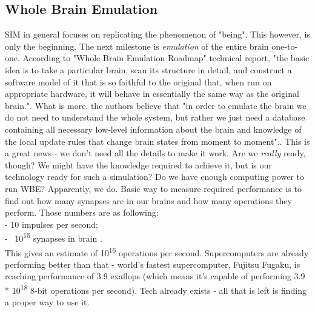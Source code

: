 \documentclass[12pt]{article}
\begin{document}
\subsection{Whole Brain Emulation}
	SIM in general focuses on replicating the phenomenon of "being". This however, is only the beginning. The next milestone is \emph{emulation} of the entire brain one-to-one. According to "Whole Brain Emulation Roadmap" technical report, "the basic idea is to take a particular brain, scan its structure in detail, and construct a software model of it that is so faithful to the original that, when run on appropriate hardware, it will behave in essentially the same way as the original brain."\cite{wbe:2}. What is more, the authors believe that "in order to emulate the brain we do not need to understand the whole system, but rather we just need a database containing all necessary low‐level information about the brain and knowledge of the local update rules that change brain states from moment to moment".\cite{wbe:2}. This is a great news - we don't need all the details to make it work. Are we \emph{really} ready, though? We might have the knowledge required to achieve it, but is our technology ready for such a simulation? Do we have enough computing power to run WBE? Apparently, we do. Basic way to measure required performance is to find out how many synapses are in our brains and how many operations they perform. Those numbers are as following:
	\\- 10 impulses per second;
	\\- ~10\textsuperscript{15} synapses in brain \cite{uploading:3}.\\This gives an estimate of 10\textsuperscript{16} operations per second. Supercomputers are already performing better than that - world's fastest supercomputer, Fujitsu Fugaku, is reaching performance of 3.9 exaflops \cite{supercomputer:1} (which means it's capable of performing 3.9 * 10\textsuperscript{18} 8-bit operations per second). Tech already exists - all that is left is finding a proper way to use it.
\end{document}
